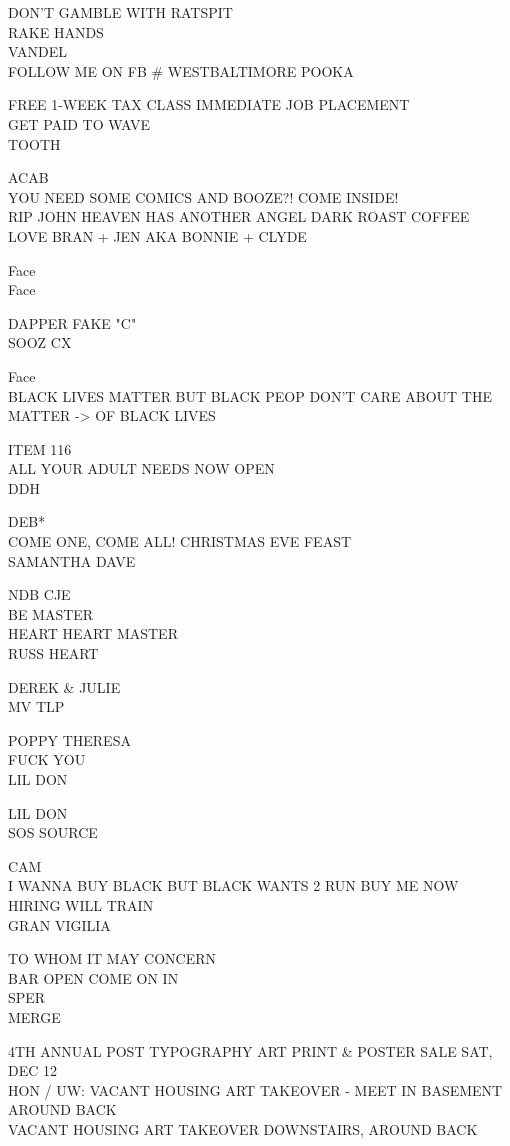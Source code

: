 \documentclass[10pt,letterpaper]{article}
\begin{document}
DON'T GAMBLE WITH RATSPIT\\
RAKE HANDS\\
VANDEL\\
FOLLOW ME ON FB \# WESTBALTIMORE POOKA

FREE 1{-}WEEK TAX CLASS IMMEDIATE JOB PLACEMENT\\
GET PAID TO WAVE\\
TOOTH

ACAB\\
YOU NEED SOME COMICS AND BOOZE?!  COME INSIDE!\\
RIP JOHN HEAVEN HAS ANOTHER ANGEL DARK ROAST COFFEE LOVE BRAN + JEN AKA BONNIE + CLYDE

Face\\
Face

DAPPER FAKE "C"\\
SOOZ CX

Face\\
BLACK LIVES MATTER BUT BLACK PEOP DON'T CARE ABOUT THE MATTER {-}> OF BLACK LIVES

ITEM 116\\
ALL YOUR ADULT NEEDS NOW OPEN\\
DDH

DEB*\\
COME ONE, COME ALL!  CHRISTMAS EVE FEAST\\
SAMANTHA DAVE

NDB CJE\\
BE MASTER\\
HEART HEART MASTER\\
RUSS HEART

DEREK \& JULIE\\
MV TLP

POPPY THERESA\\
FUCK YOU\\
LIL DON

LIL DON\\
SOS SOURCE

CAM\\
I WANNA BUY BLACK BUT BLACK WANTS 2 RUN BUY ME NOW HIRING WILL TRAIN\\
GRAN VIGILIA

TO WHOM IT MAY CONCERN\\
BAR OPEN COME ON IN\\
SPER\\
MERGE

4TH ANNUAL POST TYPOGRAPHY ART PRINT \& POSTER SALE SAT, DEC 12\\
HON / UW: VACANT HOUSING ART TAKEOVER {-} MEET IN BASEMENT AROUND BACK\\
VACANT HOUSING ART TAKEOVER DOWNSTAIRS, AROUND BACK
\end{document}
